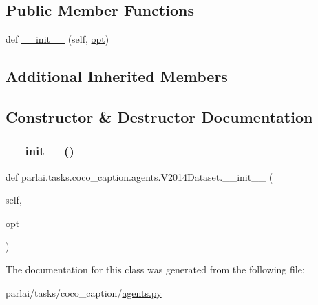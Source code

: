 \subsection*{Public Member Functions}
\begin{DoxyCompactItemize}
\item 
def \hyperlink{classparlai_1_1tasks_1_1coco__caption_1_1agents_1_1V2014Dataset_ab08e77c45352c723e1bab7397473f71f}{\+\_\+\+\_\+init\+\_\+\+\_\+} (self, \hyperlink{classparlai_1_1tasks_1_1coco__caption_1_1agents_1_1DefaultDataset_adaa89b61b63ef4c1291774fda7abaf3c}{opt})
\end{DoxyCompactItemize}
\subsection*{Additional Inherited Members}


\subsection{Constructor \& Destructor Documentation}
\mbox{\label{classparlai_1_1tasks_1_1coco__caption_1_1agents_1_1V2014Dataset_ab08e77c45352c723e1bab7397473f71f}} 
\subsubsection{\texorpdfstring{\+\_\+\+\_\+init\+\_\+\+\_\+()}{\_\_init\_\_()}}
{\footnotesize\ttfamily def parlai.\+tasks.\+coco\+\_\+caption.\+agents.\+V2014\+Dataset.\+\_\+\+\_\+init\+\_\+\+\_\+ (\begin{DoxyParamCaption}\item[{}]{self,  }\item[{}]{opt }\end{DoxyParamCaption})}



The documentation for this class was generated from the following file\+:\begin{DoxyCompactItemize}
\item 
parlai/tasks/coco\+\_\+caption/\hyperlink{parlai_2tasks_2coco__caption_2agents_8py}{agents.\+py}\end{DoxyCompactItemize}
